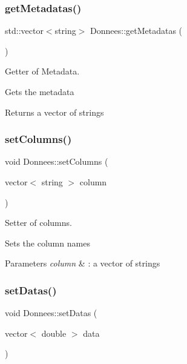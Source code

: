 \subsubsection{\texorpdfstring{get\+Metadatas()}{getMetadatas()}}
{\footnotesize\ttfamily std\+::vector$<$string$>$ Donnees\+::get\+Metadatas (\begin{DoxyParamCaption}{ }\end{DoxyParamCaption})}



Getter of Metadata. 

Gets the metadata \begin{DoxyReturn}{Returns}
a vector of strings 
\end{DoxyReturn}
\hypertarget{classDonnees_a5b8c1acea8365a6a28336170020b4ce2}{}\label{classDonnees_a5b8c1acea8365a6a28336170020b4ce2} 
\subsubsection{\texorpdfstring{set\+Columns()}{setColumns()}}
{\footnotesize\ttfamily void Donnees\+::set\+Columns (\begin{DoxyParamCaption}\item[{vector$<$ string $>$}]{column }\end{DoxyParamCaption})}



Setter of columns. 

Sets the column names 
\begin{DoxyParams}{Parameters}
{\em column} & \+: a vector of strings \\
\hline
\end{DoxyParams}
\hypertarget{classDonnees_a1887d61042d17e57978cbd85da118502}{}\label{classDonnees_a1887d61042d17e57978cbd85da118502} 
\subsubsection{\texorpdfstring{set\+Datas()}{setDatas()}}
{\footnotesize\ttfamily void Donnees\+::set\+Datas (\begin{DoxyParamCaption}\item[{vector$<$ double $>$}]{data }\end{DoxyParamCaption})}



